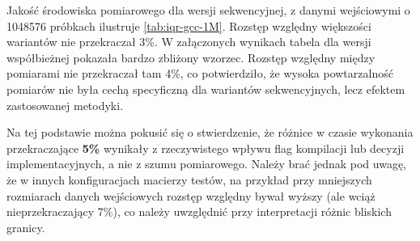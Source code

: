 Jakość środowiska pomiarowego dla wersji sekwencyjnej, z danymi wejściowymi o 1048576 próbkach  ilustruje
\cref{tab:iqr-gcc-1M}. Rozstęp względny większości wariantów nie
przekraczał 3\%.
W załączonych wynikach tabela dla wersji współbieżnej pokazała bardzo zbliżony wzorzec.
Rozstęp względny między pomiarami nie przekraczał tam 4\%, co potwierdziło, że wysoka
powtarzalność pomiarów nie była cechą specyficzną dla wariantów
sekwencyjnych, lecz efektem zastosowanej metodyki.

Na tej podstawie można pokusić się o stwierdzenie, że różnice w czasie
wykonania przekraczające \textbf{5\%} wynikały z rzeczywistego wpływu flag
kompilacji lub decyzji implementacyjnych, a nie z szumu pomiarowego. Należy brać jednak pod uwagę, że w innych konfiguracjach macierzy
testów, na przykład przy mniejszych rozmiarach danych wejściowych rozstęp względny bywał wyższy (ale wciąż nieprzekraczający 7\%), co należy uwzględnić przy
interpretacji różnic bliskich granicy.

